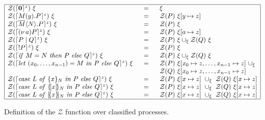 \documentclass{entcs} \usepackage{entcsmacro}
\begin{document}
\begin{figure}[bht]
\begin{center}
\begin{footnotesize}
$\begin{array}{|lll|}

\hline
\mathcal{Z}(\lceil {\bf 0}\rceil^z)~\xi&=&~~\xi\\
\mathcal{Z}(\lceil M(y).P\rceil^z)~\xi&=&~~\mathcal{Z}(P)~\xi[y\mapsto z]\\
\mathcal{Z}(\lceil \overline{M}\langle N\rangle.P\rceil^z)~\xi&=&~~\mathcal{Z}(P)~\xi\\
\mathcal{Z}(\lceil (\nu~\!a)P\rceil^z)~\xi&=&~~\mathcal{Z}(P)~\xi[a\mapsto z]\\
\mathcal{Z}(\lceil P\mid Q\rceil^z)~\xi&=&~~\mathcal{Z}(P)~\xi\cup_\xi\mathcal{Z}(Q)~\xi\\
\mathcal{Z}(\lceil !P\rceil^z)~\xi&=&~~\mathcal{Z}(P)~\xi\\
\mathcal{Z}(\lceil \mbox{{\itshape if\/} }M=N\mbox{ {\itshape then\/} }P\mbox{ {\itshape else\/} }Q\rceil^z)~\xi&=&~~\mathcal{Z}(P)~\xi\cup_\xi\mathcal{Z}(Q)~\xi\\
\mathcal{Z}(\lceil \mbox{{\itshape let\/} }(x_0,\ldots,x_{n-1})=M\mbox{ {\itshape in\/} }P\mbox{ {\itshape else\/} }Q\rceil^z)~\xi~~&=&~~\mathcal{Z}(P)~\xi[x_0\mapsto z,\ldots,x_{n-1}\mapsto z]~ \cup_\xi\\
&&~~\mathcal{Z}(Q)~\xi[x_0\mapsto z,\ldots,x_{n-1}\mapsto z]\\
\mathcal{Z}(\lceil \mbox{{\itshape case\/} }L\mbox{ {\itshape of\/} }\{x\}_N\mbox{ {\itshape in\/} }P\mbox{ {\itshape else\/} }Q\rceil^z)~\xi&=&~~\mathcal{Z}(P)~\xi[x\mapsto z]~\cup_\xi~\mathcal{Z}(Q)~\xi[x\mapsto z]\\
\mathcal{Z}(\lceil \mbox{{\itshape case\/} }L\mbox{ {\itshape of\/} }\{\![x]\!\}_N\mbox{ {\itshape in\/} }P\mbox{ {\itshape else\/} }Q\rceil^z)~\xi&=&~~\mathcal{Z}(P)~\xi[x\mapsto z]~\cup_\xi~\mathcal{Z}(Q)~\xi[x\mapsto z]\\
\mathcal{Z}(\lceil \mbox{{\itshape case\/} }L\mbox{ {\itshape of\/} }[\!\{x\}\!]_N\mbox{ {\itshape in\/} }P\mbox{ {\itshape else\/} }Q\rceil^z)~\xi&=&~~\mathcal{Z}(P)~\xi[x\mapsto z]~\cup_\xi~\mathcal{Z}(Q)~\xi[x\mapsto z]\\
\hline
\end{array}$
\end{footnotesize}
\end{center}
\caption{Definition of the $\mathcal{Z}$ function over classified processes.\label{zeta2}}
\end{figure}
\end{document}
